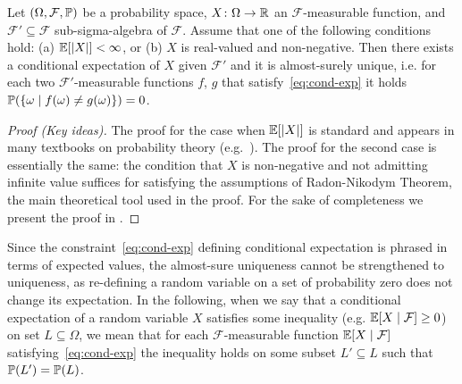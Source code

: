 \begin{proposition}
\label{prop:conditional-exp-existence}
\label{PROP:CONDITIONAL-EXP-EXISTENCE}
Let $(\Omega,\mathcal{F},\mathbb{P})$ be a probability space, 
$X\colon\Omega\rightarrow 
\mathbb{R}$ an $\mathcal{F}$-measurable function, and $\mathcal{F}'\subseteq 
\mathcal{F}$ sub-sigma-algebra of $\mathcal{F}$. Assume that one of the 
following conditions hold: (a)
$\mathbb{E}[|X|]<\infty$, or (b)
$X$ is real-valued and non-negative. 
Then there exists a conditional expectation of $X$ given $\mathcal{F}'$ and it is almost-surely unique, i.e. for each two $\mathcal{F}'$-measurable functions $f$, $g$ that satisfy~\eqref{eq:cond-exp} it holds $\mathbb{P}(\{\omega\mid f(\omega)\neq g(\omega)\})=0$.
\end{proposition}
\begin{proof}[Proof (Key ideas)]
The proof for the case when $\mathbb{E}[|X|]$ is standard and appears in many textbooks on probability theory (e.g.~\cite{Billingsley:book,Ash:book,Rosenthal:book}). The proof for the second case is essentially the same: the condition that $X$ is non-negative and not admitting infinite value suffices for satisfying the assumptions of Radon-Nikodym Theorem, the main theoretical tool used in the proof. For the sake of completeness we present the proof in \AppendixMaterial.
\end{proof}

Since the constraint~\eqref{eq:cond-exp} defining conditional expectation is 
phrased in terms of expected values, the almost-sure uniqueness cannot be 
strengthened to uniqueness, as re-defining a random variable on a set of 
probability zero does not change its expectation. In the following, when we say 
that a conditional expectation of a random variable $X$ satisfies some 
inequality (e.g. $\mathbb{E}[X\mid\mathcal{F}]\geq 0$) on set $L\subseteq \Omega$, we 
mean that for each $\mathcal{F}$-measurable function $\mathbb{E}[X\mid\mathcal{F}]$ 
satisfying~\eqref{eq:cond-exp} the inequality holds on some subset $L'\subseteq 
L$ such that $\mathbb{P}(L')=\mathbb{P}(L)$.


